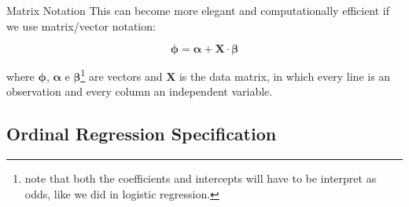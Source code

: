 \begin{frame}{Matrix Notation}
	This can become more elegant and computationally efficient if we use
	matrix/vector notation:

	$$\boldsymbol{\phi} = \boldsymbol{\alpha} + \mathbf{X} \cdot \boldsymbol{\beta}$$

	where $\boldsymbol{\phi}$, $\boldsymbol{\alpha}$ e
	$\boldsymbol{\beta}$\footnote{
		note that both the coefficients and intercepts will have to be
		interpret as odds, like we did in logistic regression.}
	are vectors and $\mathbf{X}$ is the data matrix,
	in which every line is an observation and every column an independent variable.
\end{frame}

\subsection{Ordinal Regression Specification}
